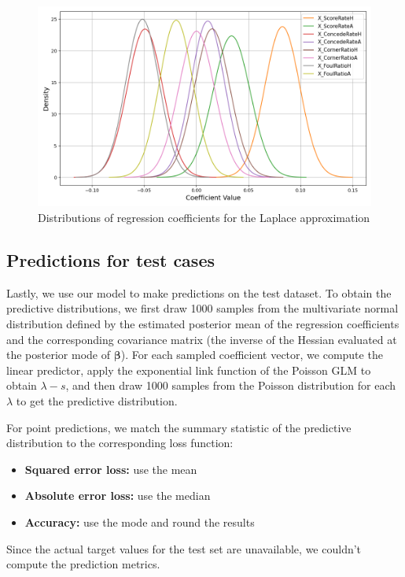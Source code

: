 \documentclass[9pt]{IEEEtran}
\begin{document}
\begin{figure}[h]
\centering
\includegraphics[width=1\columnwidth]{figures/approximation.png}
\caption{Distributions of regression coefficients for the Laplace approximation}
\label{fig:approx}
\end{figure}

\subsection{Predictions for test cases}
Lastly, we use our model to make predictions on the test dataset. 
To obtain the predictive distributions, we first draw 1000 samples from the
 multivariate normal distribution defined by the estimated posterior mean of 
 the regression coefficients and the corresponding covariance matrix (the inverse
  of the Hessian evaluated at the posterior mode of $\boldsymbol{\beta}$). For
   each sampled coefficient vector, we compute the linear predictor, apply the 
   exponential link function of the Poisson GLM to obtain $\lambda-s$, and then draw
    1000 samples from the Poisson distribution for each $\lambda$ to get
     the predictive distribution.

For point predictions, we match the summary statistic of the predictive distribution to the corresponding loss function:
\begin{itemize}
    \item \textbf{Squared error loss:} use the  mean
    \item \textbf{Absolute error loss:} use the median
    \item \textbf{Accuracy:} use the mode and round the results
\end{itemize}

Since the actual target values for the test set are unavailable,
 we couldn't compute the prediction metrics.
\end{document}
